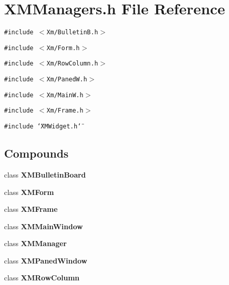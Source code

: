 \section{XMManagers.h File Reference}
\label{XMManagers_8h}
{\tt \#include $<$Xm/Bulletin\-B.h$>$}\par
{\tt \#include $<$Xm/Form.h$>$}\par
{\tt \#include $<$Xm/Row\-Column.h$>$}\par
{\tt \#include $<$Xm/Paned\-W.h$>$}\par
{\tt \#include $<$Xm/Main\-W.h$>$}\par
{\tt \#include $<$Xm/Frame.h$>$}\par
{\tt \#include \char`\"{}XMWidget.h\char`\"{}}\par
\subsection*{Compounds}
\begin{CompactItemize}
\item 
class {\bf XMBulletin\-Board}
\item 
class {\bf XMForm}
\item 
class {\bf XMFrame}
\item 
class {\bf XMMain\-Window}
\item 
class {\bf XMManager}
\item 
class {\bf XMPaned\-Window}
\item 
class {\bf XMRow\-Column}
\end{CompactItemize}
